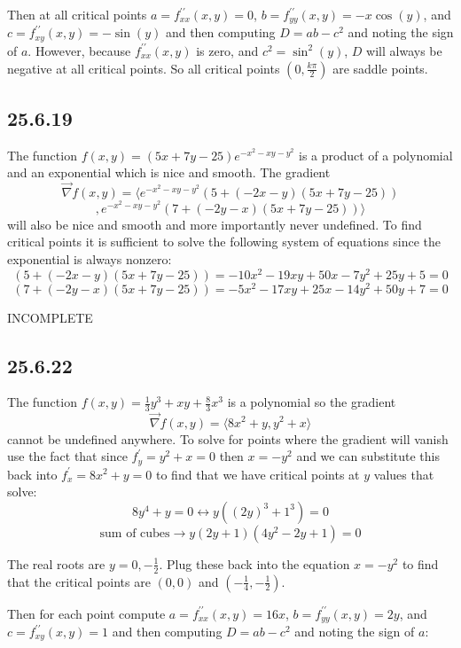 \documentclass{article}
\begin{document}
Then at all critical points $a = f^{\prime \prime}_{xx}(x,y) = 0$, $b = f^{\prime \prime}_{yy}(x,y) = -x\cos(y)$, and $c = f^{\prime \prime}_{xy}(x,y) = -\sin(y)$ and then computing $D = ab-c^2$ and noting the sign of $a$. However, because $f^{\prime \prime}_{xx}(x,y)$ is zero, and $c^2 = \sin^2(y)$, $D$ will always be negative at all critical points. So all critical points $(0, \frac{k\pi}{2})$ are saddle points.

\subsection{25.6.19}

The function $f(x,y) = (5x+7y-25)e^{-x^2-xy-y^2}$ is a product of a polynomial and an exponential which is nice and smooth. The gradient $$\vec{\nabla}f(x,y) = \langle e^{-x^2-xy-y^2}(5 + (-2x-y)(5x+7y-25))$$
$$, e^{-x^2-xy-y^2}(7 + (-2y-x)(5x+7y-25)) \rangle$$ will also be nice and smooth and more importantly never undefined. To find critical points it is sufficient to solve the following system of equations since the exponential is always nonzero:
$$(5 + (-2x-y)(5x+7y-25)) = -10 x^2 - 19 x y + 50 x - 7 y^2 + 25 y + 5 = 0$$
$$(7 + (-2y-x)(5x+7y-25)) = -5 x^2 - 17 x y + 25 x - 14 y^2 + 50 y + 7 = 0$$

INCOMPLETE

\subsection{25.6.22}

The function $f(x,y) = \frac{1}{3}y^3 + xy + \frac{8}{3}x^3$ is a polynomial so the gradient $$\vec{\nabla}f(x,y) = \langle 8x^2 + y,y^2 + x \rangle$$ cannot be undefined anywhere. To solve for points where the gradient will vanish use the fact that since $f^{\prime}_y = y^2 + x = 0$ then $x = -y^2$ and we can substitute this back into $f^{\prime}_x = 8x^2 + y = 0$ to find that we have critical points at $y$ values that solve: $$8y^4 + y = 0 \leftrightarrow y((2y)^3 + 1^3) = 0$$
$$\text{sum of cubes} \to y(2y+1)(4y^2-2y+1) = 0$$

The real roots are $y = 0,-\frac{1}{2}$. Plug these back into the equation $x = -y^2$ to find that the critical points are $(0,0)$ and $(-\frac{1}{4}, -\frac{1}{2})$.

Then for each point compute $a = f^{\prime \prime}_{xx}(x,y) = 16x$, $b = f^{\prime \prime}_{yy}(x,y) = 2y$, and $c = f^{\prime \prime}_{xy}(x,y) = 1$ and then computing $D = ab-c^2$ and noting the sign of $a$:
\end{document}
